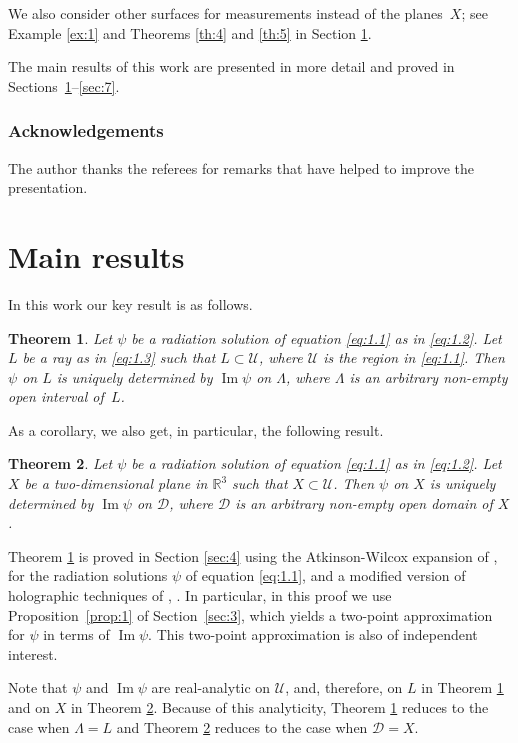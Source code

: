 \documentclass[JEP,XML,SOM,Unicode,NoEqCountersInSection,published]{cedram}
\newcommand{\RR}{\mathbb R}
\renewcommand{\Im}{\mathop{\mathrm{Im}}}
\newtheorem{theorem}{Theorem}
\theoremstyle{definition}
\begin{document}
We also consider other surfaces for measurements
instead of the planes~$X$; see Example \ref{ex:1} and Theorems \ref{th:4} and \ref{th:5} in Section \ref{sec:2}.

The main results of this work are presented in more detail and proved in Sections~\hbox{\ref{sec:2}--\ref{sec:7}}.

\subsubsection*{Acknowledgements}
The author thanks the referees for remarks that have helped to improve the presentation.

\section{Main results}\label{sec:2}

In this work our key result is as follows.

\begin{theorem}\label{th:1}
Let $\psi$ be a radiation solution of equation \eqref{eq:1.1} as in \eqref{eq:1.2}.
Let $L$ be a ray as in \eqref{eq:1.3} such that $L \subset \mathcal{U}$, where $\mathcal{U}$ is the region in \eqref{eq:1.1}. Then $\psi$ on $L$ is uniquely determined by $\Im \psi$ on $\Lambda$,
where $\Lambda$ is an arbitrary non-empty open interval of~$L$.
\end{theorem}

As a corollary, we also get, in particular, the following result.

\begin{theorem}\label{th:2}
Let $\psi$ be a radiation solution of equation \eqref{eq:1.1} as in \eqref{eq:1.2}.
Let $X$ be a two-dimensional plane in $\RR^3$ such that $X\subset \mathcal{U}$.
Then $\psi$ on $X$ is uniquely determined by $\Im \psi$ on $\mathcal{D}$,
where $\mathcal{D}$ is an arbitrary non-empty open domain of $X$.
\end{theorem}

Theorem \ref{th:1} is proved in Section \ref{sec:4} using the Atkinson-Wilcox expansion of \cite{A}, \cite{W} for the radiation solutions $\psi$ of equation \eqref{eq:1.1}, and a modified version of holographic techniques of \cite{N1}, \cite{N5}.
In particular, in this proof we use Proposition~\ref{prop:1} of Section~\ref{sec:3}, which yields a two-point approximation for $\psi$
in terms of $\Im \psi$. This two-point approximation is also of independent interest.

Note that $\psi$ and $\Im\psi$ are real-analytic on $\mathcal{U}$, and, therefore, on $L$ in Theorem \ref{th:1} and on $X$ in Theorem \ref{th:2}.
Because of this analyticity, Theorem \ref{th:1} reduces to the case when $\Lambda=L$ and Theorem \ref{th:2} reduces to the case when $\mathcal{D}=X$.
\end{document}

